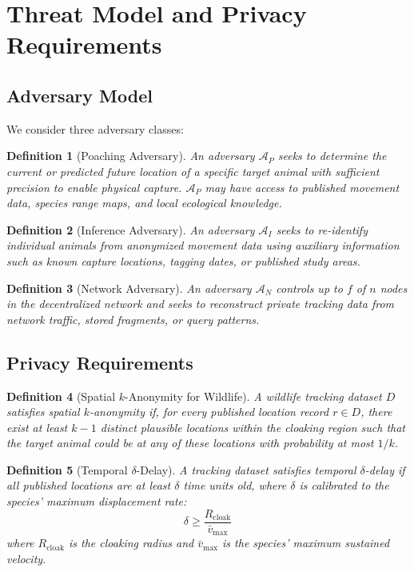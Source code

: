 \documentclass[11pt,letterpaper]{article}
\newtheorem{definition}{Definition}[section]
\begin{document}
\section{Threat Model and Privacy Requirements}

\subsection{Adversary Model}

We consider three adversary classes:

\begin{definition}[Poaching Adversary]
An adversary $\mathcal{A}_P$ seeks to determine the current or predicted future location of a specific target animal with sufficient precision to enable physical capture. $\mathcal{A}_P$ may have access to published movement data, species range maps, and local ecological knowledge.
\end{definition}

\begin{definition}[Inference Adversary]
An adversary $\mathcal{A}_I$ seeks to re-identify individual animals from anonymized movement data using auxiliary information such as known capture locations, tagging dates, or published study areas.
\end{definition}

\begin{definition}[Network Adversary]
An adversary $\mathcal{A}_N$ controls up to $f$ of $n$ nodes in the decentralized network and seeks to reconstruct private tracking data from network traffic, stored fragments, or query patterns.
\end{definition}

\subsection{Privacy Requirements}

\begin{definition}[Spatial $k$-Anonymity for Wildlife]
A wildlife tracking dataset $D$ satisfies spatial $k$-anonymity if, for every published location record $r \in D$, there exist at least $k-1$ distinct plausible locations within the cloaking region such that the target animal could be at any of these locations with probability at most $1/k$.
\end{definition}

\begin{definition}[Temporal $\delta$-Delay]
A tracking dataset satisfies temporal $\delta$-delay if all published locations are at least $\delta$ time units old, where $\delta$ is calibrated to the species' maximum displacement rate:
\begin{equation}
\delta \geq \frac{R_{\text{cloak}}}{\bar{v}_{\max}}
\end{equation}
where $R_{\text{cloak}}$ is the cloaking radius and $\bar{v}_{\max}$ is the species' maximum sustained velocity.
\end{definition}
\end{document}
